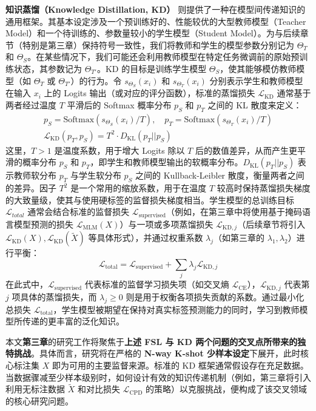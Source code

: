 \documentclass[../main.tex]{subfiles}
\begin{document}
\textbf{知识蒸馏（Knowledge Distillation, KD）} 则提供了一种在模型间传递知识的通用框架。其基本设定涉及一个预训练好的、性能较优的大型教师模型（Teacher Model）和一个待训练的、参数量较小的学生模型（Student Model）。为与后续章节（特别是第三章）保持符号一致性，我们将教师和学生的模型参数分别记为 $\Theta_T$ 和 $\Theta_S$。在某些情况下，我们可能还会利用教师模型在特定任务微调前的原始预训练状态，其参数记为 $\Theta_{T'}$。KD 的目标是训练学生模型 $\Theta_S$，使其能够模仿教师模型（如 $\Theta_T$ 或 $\Theta_{T'}$）的行为。令 $s_{\Theta_S}(x_i)$ 和 $s_{\Theta_T}(x_i)$ 分别表示学生和教师模型在输入 $x_i$ 上的 Logits 输出（或对应的评分函数），标准的蒸馏损失 $\mathcal{L}_\mathrm{KD}$ 通常基于两者经过温度 $T$ 平滑后的 Softmax 概率分布 $p_S$ 和 $p_T$ 之间的 KL 散度来定义：
\begin{gather}
	p_S = \text{Softmax}(s_{\Theta_S}(x_i)/T), \quad p_T = \text{Softmax}(s_{\Theta_T}(x_i)/T) \label{eq:kd_softmax} \\
	\mathcal{L}_\mathrm{KD}(p_T, p_S) = T^2 \cdot D_\mathrm{KL}(p_T || p_S) \label{eq:kd_loss}
\end{gather}
这里，$T > 1$ 是温度系数，用于增大 Logits 除以 $T$ 后的数值差异，从而产生更平滑的概率分布 $p_S$ 和 $p_T$，即学生和教师模型输出的软概率分布。$D_\mathrm{KL}(p_T || p_S)$ 表示教师软分布 $p_T$ 与学生软分布 $p_S$ 之间的 Kullback-Leibler 散度，衡量两者之间的差异。因子 $T^2$ 是一个常用的缩放系数，用于在温度 $T$ 较高时保持蒸馏损失梯度的大致量级，使其与使用硬标签的监督损失梯度相当。学生模型的总训练目标 $\mathcal{L}_{total}$ 通常会结合标准的监督损失 $\mathcal{L}_\mathrm{supervised}$（例如，在第三章中将使用基于掩码语言模型预测的损失 $\mathcal{L}_\mathrm{MLM}(X)$）与一项或多项蒸馏损失 $\mathcal{L}_{\mathrm{KD}, j}$（后续章节将引入 $\mathcal{L}_\mathrm{KD}(X), \mathcal{L}_\mathrm{KD}(\tilde{X})$ 等具体形式），并通过权重系数 $\lambda_j$（如第三章的 $\lambda_1, \lambda_2$）进行平衡：
\begin{equation}
	\mathcal{L}_\mathrm{total} = \mathcal{L}_\mathrm{supervised} + \sum_j \lambda_j \mathcal{L}_{\mathrm{KD}, j}
	\label{eq:kd_total_loss}
\end{equation}
在此式中，$\mathcal{L}_\mathrm{supervised}$ 代表标准的监督学习损失项（如交叉熵 $\mathcal{L}_\mathrm{CE}$），$\mathcal{L}_{\mathrm{KD}, j}$ 代表第 $j$ 项具体的蒸馏损失，而 $\lambda_j \ge 0$ 则是用于权衡各项损失贡献的系数。通过最小化总损失 $\mathcal{L}_\mathrm{total}$，学生模型被期望在保持对真实标签预测能力的同时，学习到教师模型所传递的更丰富的泛化知识。

本文\textbf{第三章}的研究工作将聚焦于\textbf{上述 FSL 与 KD 两个问题的交叉点所带来的独特挑战}。具体而言，研究将在严格的 \textbf{N-way K-shot 少样本设定}下展开，此时核心标注集 $X$ 即为可用的主要监督来源。标准的 KD 框架通常假设存在充足数据。当数据骤减至少样本级别时，如何设计有效的知识传递机制（例如，第三章将引入利用无标注数据 $\tilde{X}$ 和对比损失 $\mathcal{L}_\mathrm{CPD}$ 的策略）以克服挑战，便构成了该交叉领域的核心研究问题。
\end{document}
